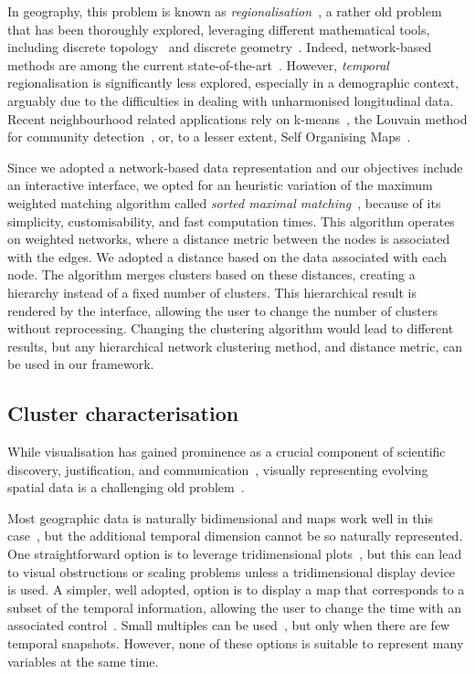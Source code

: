 In geography, this problem is known as
\emph{regionalisation}~\citep{montello2003regions}, a rather old problem that
has been thoroughly explored, leveraging different mathematical tools, including
discrete topology~\citep{brantingham1978topological} and discrete
geometry~\citep{assunccao2006efficient}. Indeed, network-based methods are among
the current state-of-the-art~\citep{Guo2008Redcap,maxp}. However,
\emph{temporal} regionalisation is significantly less explored, especially in a
demographic context, arguably due to the difficulties in dealing with
unharmonised longitudinal data. Recent neighbourhood related applications rely
on k-means~\citep{jain2010data,Delmelle2016}, the Louvain method for community
detection~\citep{blondel2008Louvain,Thomas2012}, or, to a lesser extent, Self
Organising Maps~\citep{Delmelle2017,Ling2016,Dani2013_som_maxp}.


Since we adopted a network-based data representation and our objectives include
an interactive interface, we opted for an heuristic variation of the maximum
weighted matching algorithm called \emph{sorted maximal
matching}~\citep{markus2017}, because of its simplicity, customisability, and
fast computation times. This algorithm operates on weighted networks, where a
distance metric between the nodes is associated with the edges. We adopted a
distance based on the data associated with each node. The algorithm merges
clusters based on these distances, creating a hierarchy instead of a fixed
number of clusters. This hierarchical result is rendered by the interface,
allowing the user to change the number of clusters without reprocessing.
Changing the clustering algorithm would lead to different results, but any
hierarchical network clustering method, and distance metric, can be used in our
framework. 


\subsection{Cluster characterisation}
While visualisation has gained prominence as a crucial component of scientific
discovery, justification, and communication~\citep{tufte1998visual}, visually
representing evolving spatial data is a challenging old
problem~\citep{monmonier1990strategies,andrienko2003exploratory,ferreira2015visual,Zheng2016}.

Most geographic data is naturally bidimensional and maps work well in this
case~\citep{Zheng2016,ward2015interactive}, but the additional temporal
dimension cannot be so naturally represented. One straightforward option is to
leverage tridimensional plots~\citep{andrienko2014visualization,Tominski2012a},
but this can lead to visual obstructions or scaling problems unless a
tridimensional display device is used. A simpler, well adopted,
option is to display a map that corresponds to a subset of the temporal
information, allowing the user to change the time with an associated
control~\citep{Chen2017,Valdivia2015,Alce2018,Doraiswamy2014}. Small multiples
can be used~\citep{VonLandesberger2016}, but only when there are few temporal
snapshots. However, none of these options is suitable to represent many
variables at the same time.


